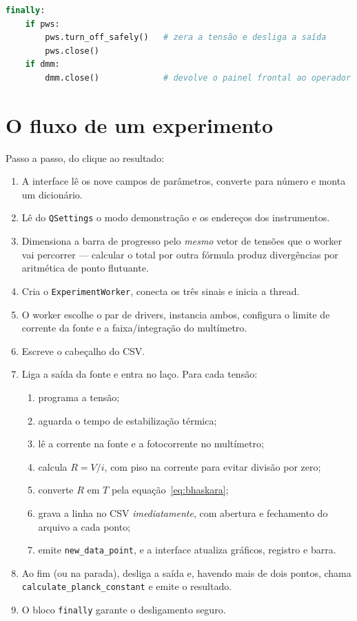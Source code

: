 \documentclass[11pt,a4paper]{article}
\newcommand{\classe}[1]{\texttt{#1}}
\begin{document}
\begin{lstlisting}[language=Python]
finally:
    if pws:
        pws.turn_off_safely()   # zera a tensão e desliga a saída
        pws.close()
    if dmm:
        dmm.close()             # devolve o painel frontal ao operador
\end{lstlisting}

\section{O fluxo de um experimento}

Passo a passo, do clique ao resultado:

\begin{enumerate}
  \item A interface lê os nove campos de parâmetros, converte para número e
        monta um dicionário.
  \item Lê do \classe{QSettings} o modo demonstração e os endereços dos
        instrumentos.
  \item Dimensiona a barra de progresso pelo \emph{mesmo} vetor de tensões que
        o worker vai percorrer --- calcular o total por outra fórmula produz
        divergências por aritmética de ponto flutuante.
  \item Cria o \classe{ExperimentWorker}, conecta os três sinais e inicia a
        thread.
  \item O worker escolhe o par de drivers, instancia ambos, configura o limite
        de corrente da fonte e a faixa/integração do multímetro.
  \item Escreve o cabeçalho do CSV.
  \item Liga a saída da fonte e entra no laço. Para cada tensão:
    \begin{enumerate}[label=\alph*.]
      \item programa a tensão;
      \item aguarda o tempo de estabilização térmica;
      \item lê a corrente na fonte e a fotocorrente no multímetro;
      \item calcula $R = V/i$, com piso na corrente para evitar divisão por zero;
      \item converte $R$ em $T$ pela equação~\eqref{eq:bhaskara};
      \item grava a linha no CSV \emph{imediatamente}, com abertura e
            fechamento do arquivo a cada ponto;
      \item emite \texttt{new\_data\_point}, e a interface atualiza gráficos,
            registro e barra.
    \end{enumerate}
  \item Ao fim (ou na parada), desliga a saída e, havendo mais de dois pontos,
        chama \texttt{calculate\_planck\_constant} e emite o resultado.
  \item O bloco \texttt{finally} garante o desligamento seguro.
\end{enumerate}
\end{document}
